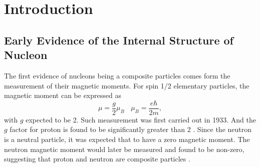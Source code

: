\documentclass[../main.tex]{subfiles}
\begin{document}
\ifSubfilesClassLoaded{\mainmatter}{}

\chapter{Introduction}
\label{ch:intro}

\section {Early Evidence of the Internal Structure of Nucleon}
The first evidence of nucleons being a composite particles comes form the 
measurement of their magnetic moments. For spin 1/2 elementary particles, the 
magnetic moment can be expressed as 
\begin{equation}
\mu = \frac{g}{2}\mu_B ~~~~ \mu_B = \frac{e\hbar}{2m},
\end{equation}
with $g$ expected to be \num{2}. Such measurement was first carried out in 1933. 
And the $g$ factor for proton is found to be  significantly greater than \num{2}
\cite{frisch1933}. Since the neutron is a neutral particle, it was expected that
to have a zero magnetic moment. The neutron magnetic moment would later be 
measured and found to be non-zero, suggesting that proton and neutron are 
composite particles \cite{rabi1934a}. 
\end{document}
